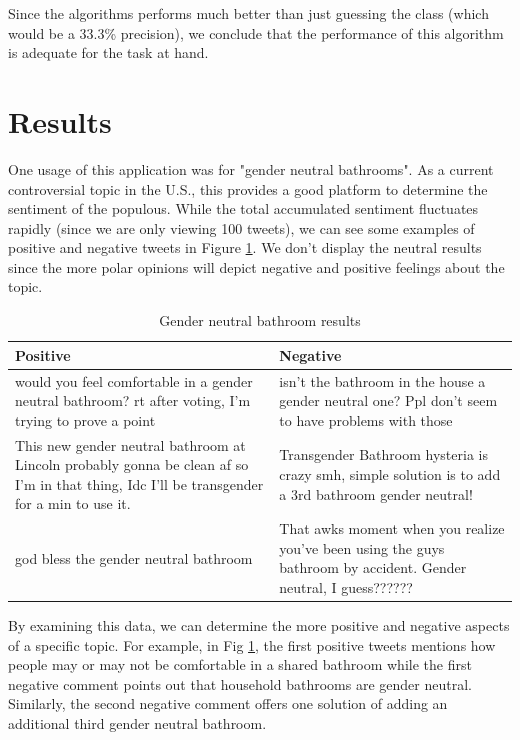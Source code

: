Since the algorithms performs much better than just guessing the class (which would be a 33.3\% precision), we conclude that the performance of this algorithm is adequate for the task at hand.

\section{Results}
One usage of this application was for "gender neutral bathrooms". As a current controversial topic in the U.S., this provides a good platform to determine the sentiment of the populous. While the total accumulated sentiment fluctuates rapidly (since we are only viewing 100 tweets), we can see some examples of positive and negative tweets in Figure \ref{tab:bathrooms}. We don't display the neutral results since the more polar opinions will depict negative and positive feelings about the topic.

\begin{table}[!ht]
\centering
\begin{tabular}{|>{\centering\arraybackslash}p{8cm}|>{\centering\arraybackslash}p{8cm}|} \hline
\textbf{Positive} & \textbf{Negative} \\ \hline \hline
would you feel comfortable in a gender neutral bathroom? rt after voting, I'm trying to prove a point & 
isn't the bathroom in the house a gender neutral one? Ppl don't seem to have problems with those \\ \hline

 This new gender neutral bathroom at Lincoln probably gonna be clean af so I'm in that thing, Idc I'll be transgender for a min to use it. & 
 Transgender Bathroom hysteria is crazy smh, simple solution is to add a 3rd bathroom gender neutral! \\ \hline 
 
 god bless the gender neutral bathroom & 
 That awks moment when you realize you've been using the guys bathroom by accident. Gender neutral, I guess?????? \\ \hline
\end{tabular}
\caption{Gender neutral bathroom results}
\label{tab:bathrooms}
\end{table}


By examining this data, we can determine the more positive and negative aspects of a specific topic. For example, in Fig \ref{tab:bathrooms}, the first positive tweets mentions how people may or may not be comfortable in a shared bathroom while the first negative comment points out that household bathrooms are gender neutral. Similarly, the 
second negative comment offers one solution of adding an additional third gender neutral bathroom. 

